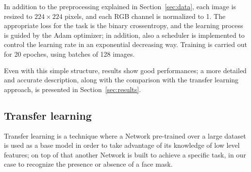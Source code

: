 \documentclass[10pt,twocolumn,letterpaper]{article}
\begin{document}
In addition to the preprocessing explained in Section~\ref{sec:data}, each image is resized to $224\times224$ pixels, and each RGB channel is normalized to 1. The appropriate loss for the task is the binary crossentropy, and the learning process is guided by the Adam optimizer; in addition, also a scheduler is implemented to control the learning rate in an exponential decreasing way. Training is carried out for 20 epoches, using batches of 128 images. 

Even with this simple structure, results show good performances; a more detailed and accurate description, along with the comparison with the transfer learning approach, is presented in Section~\ref{sec:results}.

\subsection{Transfer learning}

Transfer learning is a technique where a Network pre-trained over a large dataset is used as a base model in order to take advantage of its knowledge of low level features; on top of that another Network is built to achieve a specific task, in our case to recognize the presence or absence of a face mask.
\end{document}
